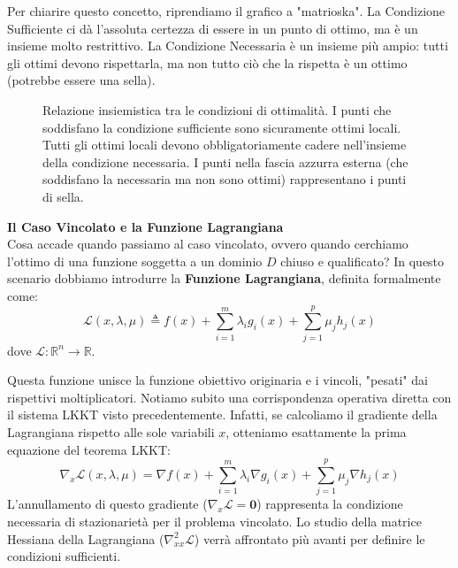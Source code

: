 \documentclass[12pt, a4paper]{article}
\newcommand{\separatore}{\noindent{\color{titlecolor!50}\rule{\textwidth}{0.6pt}}}
\begin{document}
	Per chiarire questo concetto, riprendiamo il grafico a "matrioska". La Condizione Sufficiente ci dà l'assoluta certezza di essere in un punto di ottimo, ma è un insieme molto restrittivo. La Condizione Necessaria è un insieme più ampio: tutti gli ottimi devono rispettarla, ma non tutto ciò che la rispetta è un ottimo (potrebbe essere una sella).
	
	\begin{figure}[H]
		\centering
		\caption{Relazione insiemistica tra le condizioni di ottimalità. I punti che soddisfano la condizione sufficiente sono sicuramente ottimi locali. Tutti gli ottimi locali devono obbligatoriamente cadere nell'insieme della condizione necessaria. I punti nella fascia azzurra esterna (che soddisfano la necessaria ma non sono ottimi) rappresentano i punti di sella.}
	\end{figure}
	
	\vspace{0.6cm}
	\separatore
	\vspace{0.4cm}
	
	\textbf{Il Caso Vincolato e la Funzione Lagrangiana}\\[0.2cm]
	Cosa accade quando passiamo al caso vincolato, ovvero quando cerchiamo l'ottimo di una funzione soggetta a un dominio $D$ chiuso e qualificato?
	In questo scenario dobbiamo introdurre la \textbf{Funzione Lagrangiana}, definita formalmente come:
	\[
	\mathcal{L}(x, \lambda, \mu) \triangleq f(x) + \sum_{i=1}^{m} \lambda_i g_i(x) + \sum_{j=1}^{p} \mu_j h_j(x)
	\]
	dove $\mathcal{L} : \mathbb{R}^n \to \mathbb{R}$.
	
	Questa funzione unisce la funzione obiettivo originaria e i vincoli, "pesati" dai rispettivi moltiplicatori. Notiamo subito una corrispondenza operativa diretta con il sistema LKKT visto precedentemente. Infatti, se calcoliamo il gradiente della Lagrangiana rispetto alle sole variabili $x$, otteniamo esattamente la prima equazione del teorema LKKT:
	\[
	\nabla_x \mathcal{L}(x, \lambda, \mu) = \nabla f(x) + \sum_{i=1}^{m} \lambda_i \nabla g_i(x) + \sum_{j=1}^{p} \mu_j \nabla h_j(x)
	\]
	L'annullamento di questo gradiente ($\nabla_x \mathcal{L} = \mathbf{0}$) rappresenta la condizione necessaria di stazionarietà per il problema vincolato. Lo studio della matrice Hessiana della Lagrangiana ($\nabla_{xx}^2 \mathcal{L}$) verrà affrontato più avanti per definire le condizioni sufficienti.
	
\end{document}
